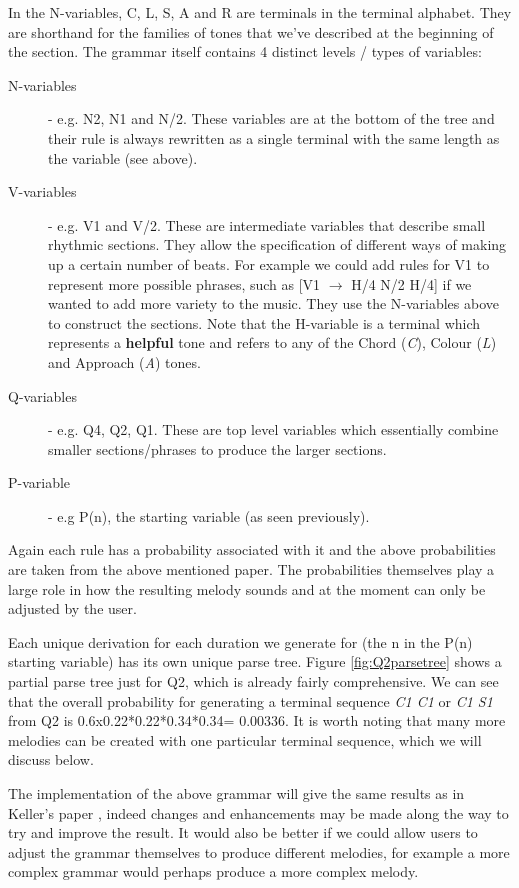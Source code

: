 \documentclass[pdftex,12pt,a4paper]{report}
\begin{document}
In the N-variables, C, L, S, A and R are terminals in the terminal alphabet. They are shorthand for the families of tones that we've described at the beginning of the section. The grammar itself contains 4 distinct levels / types of variables:

\begin{description}
  \item[N-variables] - e.g. N2, N1 and N/2. These variables are at the bottom of the tree and their rule is always rewritten as a single terminal with the same length as the variable (see above).
  \item[V-variables]  - e.g. V1 and V/2. These are intermediate variables that describe small rhythmic sections. They allow the specification of different ways of making up a certain number of beats. For example we could add rules for V1 to represent more possible phrases, such as [V1 $\rightarrow$ H/4 N/2 H/4] if we wanted to add more variety to the music. They use the N-variables above to construct the sections. Note that the H-variable is a terminal which represents a \textbf{helpful} tone and refers to any of the Chord (\textit{C}), Colour (\textit{L}) and Approach (\textit{A}) tones.
  \item[Q-variables] - e.g. Q4, Q2, Q1. These are top level variables which essentially combine smaller sections/phrases to produce the larger sections. 
  \item[P-variable] - e.g P(n), the starting variable (as seen previously).
\end{description}

Again each rule has a probability associated with it and the above probabilities are taken from the above mentioned paper. The probabilities themselves play a large role in how the resulting melody sounds and at the moment can only be adjusted by the user.

Each unique derivation for each duration we generate for (the n in the P(n) starting variable) has its own unique parse tree. Figure \ref{fig:Q2parsetree} shows a partial parse tree just for Q2, which is already fairly comprehensive. We can see that the overall probability for generating a terminal sequence \emph{C1 C1} or \emph{C1 S1} from Q2 is 0.6x0.22*0.22*0.34*0.34= 0.00336. It is worth noting that many more melodies can be created with one particular terminal sequence, which we will discuss below.

The implementation of the above grammar will give the same results as in Keller's paper \cite{keller07}, indeed changes and enhancements may be made along the way to try and improve the result. 
It would also be better if we could allow users to adjust the grammar themselves to produce different melodies, for example a more complex grammar would perhaps produce a more complex melody. 
\end{document}
